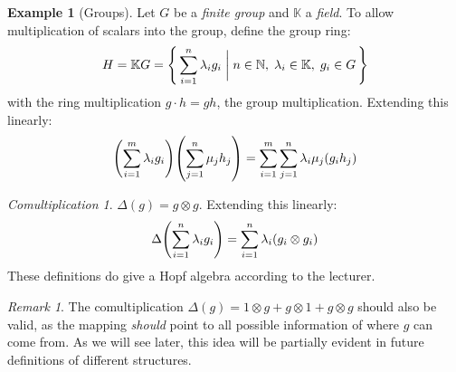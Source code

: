 \documentclass{article}
\theoremstyle{definition}
\newtheorem{Example}{Example}
\theoremstyle{remark}
\newtheorem*{Remark*}{Remark}
\theoremstyle{underline}
\theoremstyle{underline}
\newtheorem*{Comultiplication*}{Comultiplication}
\begin{document}
	\begin{Example}[Groups]
		Let $G$ be a \emph{finite group} and $\mathbb{K}$ a \emph{field}. To allow multiplication of scalars into the group, define the group ring:
		\begin{gather*}
		H = \mathbb KG = \qty{\, \sum_{i = 1}^n\lambda_i g_i \biggm| n \in \mathbb N,\; \lambda_i \in \mathbb K,\; g_i \in G \,}	
		\end{gather*}
		with the ring multiplication	$g \cdot h= gh$, the group multiplication. Extending this linearly:
			\begin{gather*}
			\pqty{\sum_{i = 1}^{m}\lambda_i g_i}\pqty{\sum_{j = 1}^{n}\mu_j h_j} = \sum_{i = 1}^m \sum_{j = 1}^n \lambda_i \mu_j(g_i h_j)
			\end{gather*}
		
		\begin{Comultiplication*}
			$ \Delta(g) = g \otimes g $. Extending this linearly:
			\begin{gather*}
				\Delta\pqty{\sum_{i = 1}^n \lambda_ig_i} = \sum_{i = 1}^n \lambda_i(g_i \otimes g_i)
			\end{gather*}
			These definitions do give a Hopf algebra according to the lecturer. 	
		\end{Comultiplication*}
		
		\begin{Remark*}
			The comultiplication $ \Delta(g) = 1 \otimes g + g \otimes 1 + g \otimes g$ should also be valid, as the mapping \emph{should} point to all possible information of where $g$ can come from. As we will see later, this idea will be partially evident in future definitions of different structures.
		\end{Remark*}
		
	\end{Example}
	
\end{document}
